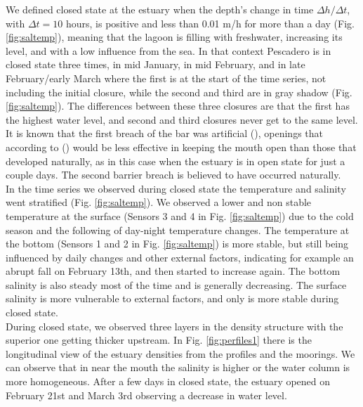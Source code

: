 \documentclass[11pt,letterpaper]{article}
\begin{document}
We defined closed state at the estuary when the depth's change in time $\Delta h/\Delta t$, with $\Delta t=10$ hours, is positive and less than 0.01 m/h for more than a day (Fig. \ref{fig:saltemp}), meaning that the lagoon is filling with freshwater, increasing its level, and with a low influence from the sea. In that context Pescadero is in closed state three times, in mid January, in mid February, and in late February/early March where the first is at the start of the time series, not including the initial closure, while the second and third are in gray shadow (Fig. \ref{fig:saltemp}). The differences between these three closures are that the first has the highest water level, and second and third closures never get to the same level. \\

It is known that the first breach of the bar was artificial (\cite{Williams2014}), openings that according to  (\cite*{Behrens2013}) would be less effective in keeping the mouth open than those that developed naturally, as in this case when the estuary is in open state for just a couple days. The second barrier breach is believed to have occurred naturally. \\

In the time series we observed during closed state the temperature and salinity went stratified (Fig. \ref{fig:saltemp}). We observed a lower and non stable temperature at the surface (Sensors 3 and 4 in Fig. \ref{fig:saltemp}) due to the cold season and the following of day-night temperature changes. The temperature at the bottom (Sensors 1 and 2 in Fig. \ref{fig:saltemp}) is more stable, but still being influenced by daily changes and other external factors, indicating for example an abrupt fall on February 13th, and then started to increase again. The bottom salinity is also steady most of the time and is generally decreasing. The surface salinity is more vulnerable to external factors, and only is more stable during closed state. \\ 

During closed state, we observed three layers in the density structure with the superior one getting thicker upstream. In Fig. \ref{fig:perfiles1} there is the longitudinal view of the estuary densities from the profiles and the moorings. We can observe that in near the mouth the salinity is higher or the water column is more homogeneous. After a few days in closed state, the estuary opened on February 21st and March 3rd observing a decrease in water level. \\
\end{document}
